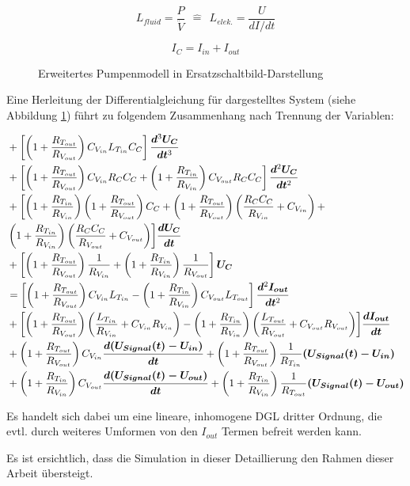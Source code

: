 \documentclass[fontsize=12pt, a4paper]{scrartcl}
\begin{document}
\begin{equation}
	L_{fluid} = \frac{P}{\ddot{V}} \:\:\widehat{=}\:\: L_{elek.} = \frac{U}{dI/dt}
\end{equation}

\begin{equation}
	I_{C} = I_{in} + I_{out}
\end{equation}

\begin{figure}[H]
	
	\caption{Erweitertes Pumpenmodell in Ersatzschaltbild-Darstellung}
	\label{outlookcircuit}
\end{figure}

Eine Herleitung der Differentialgleichung für dargestelltes System (siehe Abbildung \ref{outlookcircuit}) führt zu folgendem Zusammenhang nach Trennung der Variablen:

\begin{equation}
	\begin{split}
		&+ \left[\left(1+\frac{R_{T_{out}}}{R_{V_{out}}}\right)C_{V_{in}}L_{T_{in}}C_{C}\right]\bm{\frac{d\textsuperscript{3}U_{C}}{dt\textsuperscript{3}}} \\
		&+ \left[\left(1+\frac{R_{T_{out}}}{R_{V_{out}}}\right)C_{V_{in}}R_{C}C_{C} + \left(1+\frac{R_{T_{in}}}{R_{V_{in}}}\right)C_{V_{out}}R_{C}C_{C}\right]\bm{\frac{d\textsuperscript{2}U_{C}}{dt\textsuperscript{2}}} \\
		&+ \biggl[\left(1+\frac{R_{T_{in}}}{R_{V_{in}}}\right)\left(1+\frac{R_{T_{out}}}{R_{V_{out}}}\right)C_{C} + \left(1+\frac{R_{T_{out}}}{R_{V_{out}}}\right)\left(\frac{R_{C}C_{C}}{R_{V_{in}}}+C_{V_{in}}\right) + \\
		& \left(1+\frac{R_{T_{in}}}{R_{V_{in}}}\right)\left(\frac{R_{C}C_{C}}{R_{V_{out}}}+C_{V_{out}}\right)\biggr] \bm{\frac{dU_{C}}{dt}}  \\
		&+ \left[\left(1+\frac{R_{T_{out}}}{R_{V_{out}}}\right)\frac{1}{R_{V_{in}}} + \left(1+\frac{R_{T_{in}}}{R_{V_{in}}}\right)\frac{1}{R_{V_{out}}}\right]\bm{U_{C}} \\
		&= \left[\left(1+\frac{R_{T_{out}}}{R_{V_{out}}}\right)C_{V_{in}}L_{T_{in}} - \left(1+\frac{R_{T_{in}}}{R_{V_{in}}}\right)C_{V_{out}}L_{T_{out}}\right]\bm{\frac{d\textsuperscript{2}I_{out}}{dt\textsuperscript{2}}} \\
		&+ \biggl[\left(1+\frac{R_{T_{out}}}{R_{V_{out}}}\right)\left(\frac{L_{T_{in}}}{R_{V_{in}}}+C_{V_{in}}R_{V_{in}}\right) - \left(1+\frac{R_{T_{in}}}{R_{V_{in}}}\right)\left(\frac{L_{T_{out}}}{R_{V_{out}}}+C_{V_{out}}R_{V_{out}}\right)\biggr]\bm{\frac{dI_{out}}{dt}} \\
		&+ \left(1+\frac{R_{T_{out}}}{R_{V_{out}}}\right)C_{V_{in}}\bm{\frac{d(U_{Signal}(t) - U_{in})}{dt}} + \left(1+\frac{R_{T_{out}}}{R_{V_{out}}}\right)\frac{1}{R_{T_{in}}}\bm{(U_{Signal}(t) - U_{in})} \\
		&+ \left(1+\frac{R_{T_{in}}}{R_{V_{in}}}\right)C_{V_{out}}\bm{\frac{d(U_{Signal}(t) - U_{out})}{dt}} + \left(1+\frac{R_{T_{in}}}{R_{V_{in}}}\right)\frac{1}{R_{T_{out}}}\bm{(U_{Signal}(t) - U_{out})}
	\end{split}
\end{equation}

Es handelt sich dabei um eine lineare, inhomogene DGL dritter Ordnung, die evtl. durch weiteres Umformen von den $I_{out}$ Termen befreit werden kann. 

Es ist ersichtlich, dass die Simulation in dieser Detaillierung den Rahmen dieser Arbeit übersteigt.


\printbibliography
\end{document}
